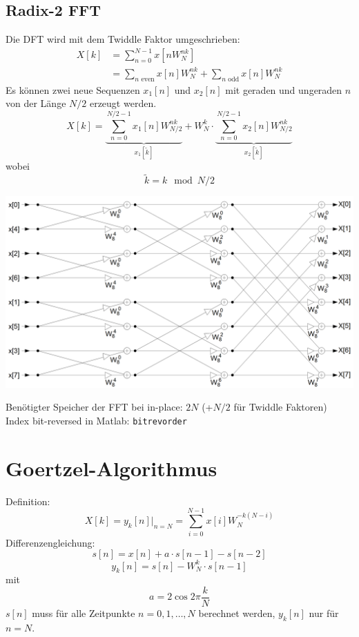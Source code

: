 \subsection{Radix-2 FFT}
Die DFT wird mit dem Twiddle Faktor umgeschrieben:
\[\begin{aligned} X[k] &= \sum_{n=0}^{N-1} x[nW_N^{nk}]\\
	&= \sum_{n \textrm{ even}} x[n]W_N^{nk} + \sum_{n\textrm{ odd}}x[n]W_N^{nk}
\end{aligned}\]
Es können zwei neue Sequenzen $x_1[n]$ und $x_2[n]$ mit geraden und ungeraden
$n$ von der Länge $N/2$ erzeugt werden.
\[ X[k] = \underbrace{\sum_{n=0}^{N/2-1}x_1[n]W_{N/2}^{nk}}_{x_1[\tilde{k}]} +
	W_N^k\cdot \underbrace{\sum_{n=0}^{N/2-1} x_2[n]W_{N/2}^{nk}}_
	{{x_2[\tilde{k}]}} \]
wobei
\[ \tilde{k} = k\mod N/2 \]

\begin{center}
	\includegraphics[scale=.7]{./images/fft}
\end{center}
Benötigter Speicher der FFT bei in-place: $2N$ (+$N/2$ für Twiddle Faktoren)
Index bit-reversed in Matlab: \verb|bitrevorder|

\section{Goertzel-Algorithmus}
Definition:
\[ X[k] = y_k[n]|_{n=N} = \sum_{i=0}^{N-1}x[i]W_N^{-k(N-i)} \]
Differenzengleichung:
\[ s[n] = x[n] + a \cdot s[n-1] - s[n-2] \]
\[ y_k[n] = s[n] - W_N^k \cdot s[n-1] \]
mit 
\[ a= 2\cos 2\pi\frac{k}{N} \]
$s[n]$ muss für alle Zeitpunkte $n=0,1,\ldots,N$ berechnet werden, $y_k[n]$
nur für $n=N$.


